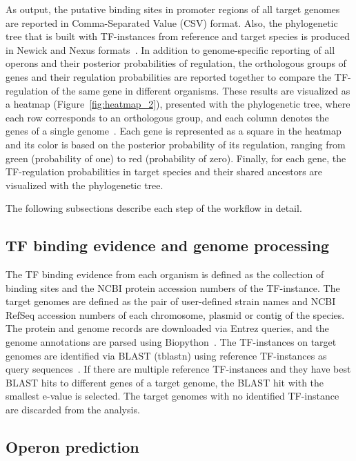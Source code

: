 \documentclass[12pt]{article}
\begin{document}
As output, the putative binding sites in promoter regions of all target genomes
are reported in Comma-Separated Value (CSV) format. Also, the phylogenetic tree
that is built with TF-instances from reference and target species is produced
in Newick and Nexus formats~\cite{maddison1997nexus,
  felsenstein2004inferring}. In addition to genome-specific reporting of all
operons and their posterior probabilities of regulation, the orthologous groups
of genes and their regulation probabilities are reported together to compare
the TF-regulation of the same gene in different organisms. These results are
visualized as a heatmap (Figure~\ref{fig:heatmap_2}), presented with the
phylogenetic tree, where each row corresponds to an orthologous group, and each
column denotes the genes of a single genome~\cite{huerta2016ete}. Each gene is
represented as a square in the heatmap and its color is based on the posterior
probability of its regulation, ranging from green (probability of one) to red
(probability of zero). Finally, for each gene, the TF-regulation probabilities
in target species and their shared ancestors are visualized with the
phylogenetic tree.

The following subsections describe each step of the workflow in detail.

\subsection{TF binding evidence and genome processing}

The TF binding evidence from each organism is defined as the collection of
binding sites and the NCBI protein accession numbers of the TF-instance. The
target genomes are defined as the pair of user-defined strain names and NCBI
RefSeq accession numbers of each chromosome, plasmid or contig of the
species. The protein and genome records are downloaded via Entrez queries, and
the genome annotations are parsed using Biopython~\cite{wheeler2007database,
  cock2009biopython}. The TF-instances on target genomes are identified via
BLAST (tblastn) using reference TF-instances as query
sequences~\cite{altschul1990basic}. If there are multiple reference
TF-instances and they have best BLAST hits to different genes of a target
genome, the BLAST hit with the smallest e-value is selected. The target genomes
with no identified TF-instance are discarded from the analysis.

\subsection{Operon prediction}
\end{document}
